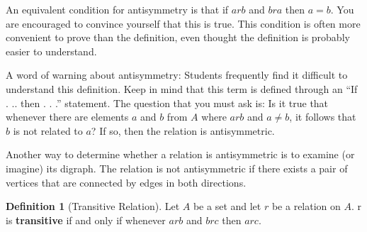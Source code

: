 \documentclass[10pt,]{book}
\newcommand{\terminology}[1]{\textbf{#1}}
\theoremstyle{plain}
\theoremstyle{definition}
\newtheorem{definition}[theorem]{Definition}
\theoremstyle{definition}
\theoremstyle{definition}
\theoremstyle{definition}
\begin{document}
\par
An equivalent condition for antisymmetry is that if \(a r b\) and  \(b r a\) then \(a = b\). You are encouraged to convince yourself that this is true.  This condition is often more convenient to prove than the definition, even thought the definition is probably easier to understand.%
\par
A word of warning about antisymmetry: Students frequently find it difficult to understand this definition. Keep in mind that this term is defined through an ``If . .. then . . .'' statement. The question that you must ask is: Is it true that whenever there are elements \(a\) and \(b\) from \(A\) where \(a r b\) and \(a \neq  b\), it follows that \(b\) is not related to \(a\)? If so, then the relation  is antisymmetric.%
\par
Another way to determine whether a relation is antisymmetric is to examine (or imagine) its digraph. The relation is not antisymmetric if there exists a pair of vertices that are connected by edges in both directions.%
\begin{definition}[Transitive Relation]\label{def-transitive-relation}
Let \(A\) be a set and let \(r\) be a relation on \(A\).
r is \terminology{transitive} if and only if whenever \(a r b\) and \(b r c\) then \(a r c\).%
\end{definition}
\typeout{************************************************}
\typeout{************************************************}
\end{document}
